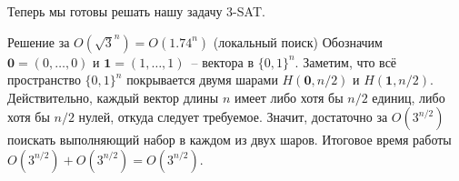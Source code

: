 Теперь мы готовы решать нашу задачу 3-SAT.

\begin{algodescription}{Решение за $O\left(\sqrt{3}^n\right) = O(1.74^n)$ (локальный поиск)}
Обозначим $\mathbf 0 = (0, \ldots, 0)$ и $\mathbf 1 = (1, \ldots, 1)$~-- вектора в $\{0, 1\}^n$. Заметим, что всё пространство $\{0, 1\}^n$ покрывается двумя шарами $H(\mathbf 0, n/2)$ и $H(\mathbf 1, n/2)$. Действительно, каждый вектор длины $n$ имеет либо хотя бы $n/2$ единиц, либо хотя бы $n/2$ нулей, откуда следует требуемое. Значит, достаточно за $O(3^{n/2})$ поискать выполняющий набор в каждом из двух шаров. Итоговое время работы $O\left(3^{n/2}\right) + O\left(3^{n/2}\right) = O\left(3^{n/2}\right)$.
\end{algodescription}

